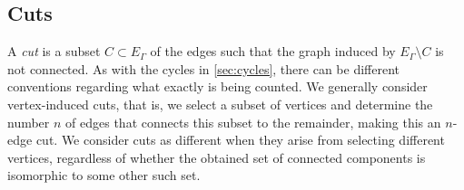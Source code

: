 \documentclass[12pt]{article}
\numberwithin{equation}{section}
\begin{document}
\subsection{Cuts}\label{sec:cuts}


A \emph{cut} is  a subset $C \subset E_\Gamma$ of the edges such that the graph induced by $E_\Gamma \setminus C$ is not connected.   As with the cycles in \cref{sec:cycles}, there can be different conventions regarding what exactly is being counted. We generally consider vertex-induced cuts, that is, we select a subset of vertices and determine the number $n$ of edges that connects this subset to the remainder, making this an $n$-edge cut. We consider cuts as different when they arise from selecting different vertices, regardless of whether the obtained set of connected components is isomorphic to some other such set.  
\end{document}
